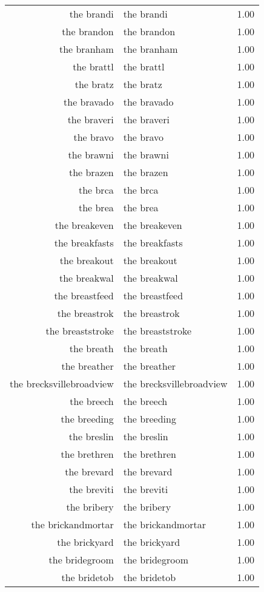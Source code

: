 \begin{table}[ht]
\begin{tabular}{rlr}
  the brandi & the brandi & 1.00 \\ 
  the brandon & the brandon & 1.00 \\ 
  the branham & the branham & 1.00 \\ 
  the brattl & the brattl & 1.00 \\ 
  the bratz & the bratz & 1.00 \\ 
  the bravado & the bravado & 1.00 \\ 
  the braveri & the braveri & 1.00 \\ 
  the bravo & the bravo & 1.00 \\ 
  the brawni & the brawni & 1.00 \\ 
  the brazen & the brazen & 1.00 \\ 
  the brca & the brca & 1.00 \\ 
  the brea & the brea & 1.00 \\ 
  the breakeven & the breakeven & 1.00 \\ 
  the breakfasts & the breakfasts & 1.00 \\ 
  the breakout & the breakout & 1.00 \\ 
  the breakwal & the breakwal & 1.00 \\ 
  the breastfeed & the breastfeed & 1.00 \\ 
  the breastrok & the breastrok & 1.00 \\ 
  the breaststroke & the breaststroke & 1.00 \\ 
  the breath & the breath & 1.00 \\ 
  the breather & the breather & 1.00 \\ 
  the brecksvillebroadview & the brecksvillebroadview & 1.00 \\ 
  the breech & the breech & 1.00 \\ 
  the breeding & the breeding & 1.00 \\ 
  the breslin & the breslin & 1.00 \\ 
  the brethren & the brethren & 1.00 \\ 
  the brevard & the brevard & 1.00 \\ 
  the breviti & the breviti & 1.00 \\ 
  the bribery & the bribery & 1.00 \\ 
  the brickandmortar & the brickandmortar & 1.00 \\ 
  the brickyard & the brickyard & 1.00 \\ 
  the bridegroom & the bridegroom & 1.00 \\ 
  the bridetob & the bridetob & 1.00 \\ 

\end{tabular}
\end{table}
